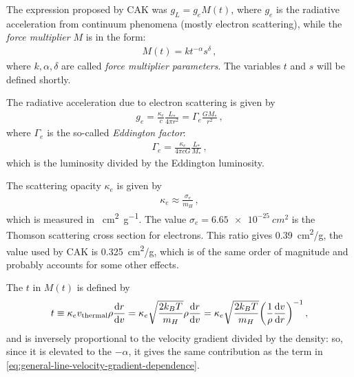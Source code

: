 \documentclass[main.tex]{subfiles}
\begin{document}
The expression proposed by CAK was \(g_L = g_e M(t)\), where \(g_e\) is the radiative acceleration from continuum phenomena (mostly electron scattering), while the \emph{force multiplier} \(M\) is in the form: 
%
\begin{align}
  M(t)  = k t^{-\alpha } s^{ \delta }
\,,
\end{align}
%
where \(k , \alpha , \delta \) are called \emph{force multiplier parameters}. The variables \(t\) and \(s\) will be defined shortly.

The radiative acceleration due to electron scattering is given by 
%
\begin{align}
  g_e = \frac{\kappa _e}{c} \frac{L_{*}}{4 \pi r^2} = \Gamma _e \frac{GM_{*}}{r^2}
\,,
\end{align}
%
where \(\Gamma _e \) is the so-called \emph{Eddington factor}: 
%
\begin{align}
  \Gamma _e = \frac{\kappa _e}{4 \pi c G} \frac{L_{*}}{M_{*}}
\,,
\end{align}
%
which is the luminosity divided by the Eddington luminosity.

The scattering opacity \(\kappa _e\) is given by 
%
\begin{align}
  \kappa _e \approx \frac{\sigma_{e}}{m_H }
\,,
\end{align}
%
which is measured in \SI{}{cm^2g^{-1}}. The value \(\sigma _e = \SI{6.65e-25}{cm^2}\) is the Thomson scattering cross section for electrons. This ratio gives \SI{0.39}{cm^2/g}, the value used by CAK is \SI{.325}{cm^2/g}, which is of the same order of magnitude and probably accounts for some other effects.

The \(t\) in \(M(t)\) is defined by 
%
\begin{align}
  t \equiv \kappa _e v _{\text{thermal}} \rho \dv{r}{v}
  = \kappa_e \sqrt{\frac{2 k_B T}{m_H}} \rho \dv{r}{v}
  = \kappa_{e} \sqrt{\frac{2 k_B T}{m_H}} \qty(\frac{1}{\rho } \dv{v}{r})^{-1}
\,,
\end{align}
%
and is inversely proportional to the velocity gradient divided by the density: so, since it is elevated to the \(- \alpha \), it gives the same contribution as the term in \eqref{eq:general-line-velocity-gradient-dependence}.
\end{document}
